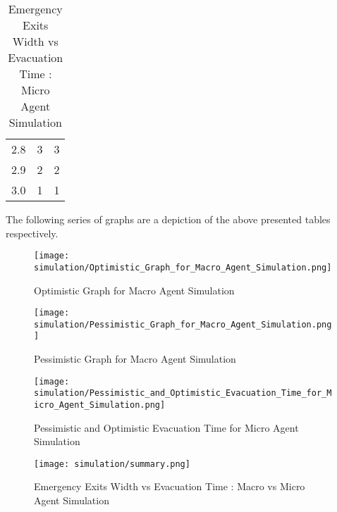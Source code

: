 \begin{table}[H]
{\begin{tabular}{|l|l|l|}
2.8                      & 3                                                                                                                    & 3                                                                                                                      \\
2.9                      & 2                                                                                                                    & 2                                                                                                                      \\
3.0                      & 1                                                                                                                    & 1                                                                                                                      \\
\hline
\end{tabular}}
\caption{Emergency Exits Width vs Evacuation Time : Micro Agent Simulation}
\label{Emergency Exits Width vs Evacuation Time : Micro Agent Simulation}
\end{table}

The following series of graphs are a depiction of the above presented tables respectively. 

\begin{figure}[H]
  \centering
  \texttt{[image: simulation/Optimistic\_Graph\_for\_Macro\_Agent\_Simulation.png]}
  \caption{Optimistic Graph for Macro Agent Simulation}
  \label{Optimistic Graph for Macro Agent Simulation}
\end{figure}

\begin{figure}[H]
  \centering
  \texttt{[image: simulation/Pessimistic\_Graph\_for\_Macro\_Agent\_Simulation.png]}
  \caption{Pessimistic Graph for Macro Agent Simulation}
  \label{Pessimistic Graph for Macro Agent Simulation}
\end{figure}

\begin{figure}[H]
  \centering
  \texttt{[image: simulation/Pessimistic\_and\_Optimistic\_Evacuation\_Time\_for\_Micro\_Agent\_Simulation.png]}
  \caption{Pessimistic and Optimistic Evacuation Time for Micro Agent Simulation}
  \label{Pessimistic and Optimistic Evacuation Time for Micro Agent Simulation}
\end{figure}

\begin{figure}[H]
  \centering
  \texttt{[image: simulation/summary.png]}
  \caption{Emergency Exits Width vs Evacuation Time : Macro vs Micro Agent Simulation}
  \label{Emergency Exits Width vs Evacuation Time : Macro vs Micro Agent Simulation}
\end{figure}

